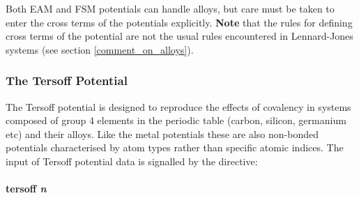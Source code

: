 Both EAM and FSM potentials can handle alloys, but care must be taken
to enter the cross terms of the potentials explicitly. {\bf Note} that
the rules for defining cross terms of the potential are not the usual
rules encountered in Lennard-Jones systems (see section
\ref{comment_on_alloys}). 

\subsubsection{The Tersoff Potential}
The Tersoff potential \cite{tersoff-89a} is
designed to reproduce the effects of covalency in systems composed of
group 4 elements in the periodic table (carbon, silicon, germanium
etc) and their alloys. Like the metal potentials these are also
non-bonded potentials characterised by atom types rather than
specific atomic indices. The input of Tersoff potential data is
signalled by the directive:

\paragraph*{tersoff {\em n}}
\paragraph*{}

